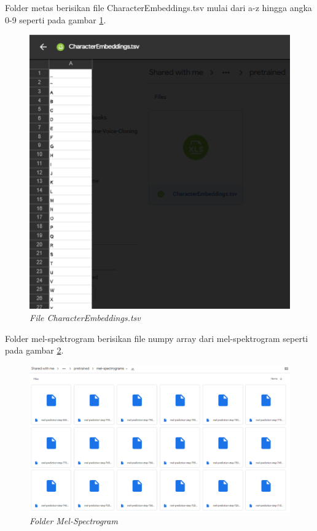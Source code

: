 \begin{enumerate}
 Folder metas berisikan file CharacterEmbeddings.tsv mulai dari a-z hingga angka 0-9 seperti pada gambar \ref{hasil21}.

\begin{figure}[H]
    \centering
    \includegraphics[scale=0.4]{figures/hasil21}
    \caption{\textit{File CharacterEmbeddings.tsv}}
    \label{hasil21}
\end{figure}

Folder mel-spektrogram berisikan file numpy array dari mel-spektrogram seperti pada gambar \ref{hasil22}.

\begin{figure}[H]
    \centering
    \includegraphics[scale=0.35]{figures/hasil22}
    \caption{\textit{Folder Mel-Spectrogram}}
    \label{hasil22}
\end{figure}


\end{enumerate}
